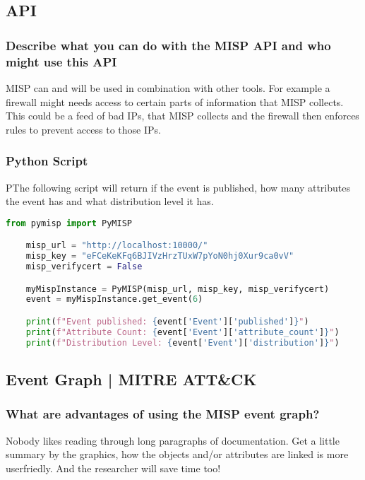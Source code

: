 \subsection{API}

\subsubsection{Describe what you can do with the MISP API and who might use this API}
MISP can and will be used in combination with other tools. For example a firewall might needs access to certain parts of information that MISP collects. This could be a feed of bad IPs, that MISP collects and the firewall then enforces rules to prevent access to those IPs.

\subsubsection{Python Script}
PThe following script will return if the event is published, how many attributes the event has and what distribution level it has.

\begin{lstlisting}[language=Python]
    from pymisp import PyMISP

    misp_url = "http://localhost:10000/"
    misp_key = "eFCeKeKFq6BJIVzHrzTUxW7pYoN0hj0Xur9ca0vV"
    misp_verifycert = False

    myMispInstance = PyMISP(misp_url, misp_key, misp_verifycert)
    event = myMispInstance.get_event(6)

    print(f"Event published: {event['Event']['published']}")
    print(f"Attribute Count: {event['Event']['attribute_count']}")
    print(f"Distribution Level: {event['Event']['distribution']}")
\end{lstlisting}

\newpage

\subsection{Event Graph | MITRE ATT\&CK}

\subsubsection{What are advantages of using the MISP event graph?}
Nobody likes reading through long paragraphs of documentation. Get a little summary by the graphics, how the objects and/or attributes are linked is more userfriedly. And the researcher will save time too!

